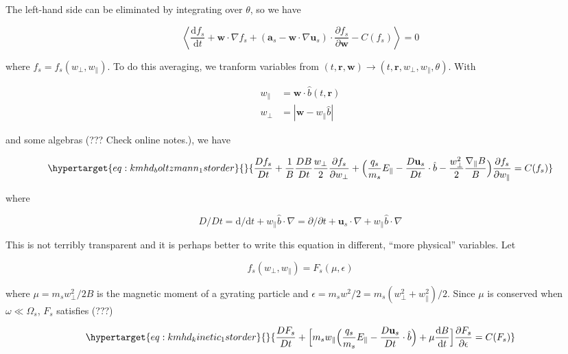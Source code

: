 \documentclass[
  notoc %
]{tufte-book}
\begin{document}
The left-hand side can be eliminated by integrating over \(\theta\), so
we have

\[
\left< \frac{\mathrm{d} f_s}{\mathrm{d}t} + \mathbf{w}\cdot\nabla f_s + (\mathbf{a}_s - \mathbf{w}\cdot\nabla\mathbf{u}_s)\cdot\frac{\partial f_s}{\partial\mathbf{w}} - C(f_s) \right> = 0
\]

where \(f_s = f_s(w_\perp,w_\parallel)\). To do this averaging, we
tranform variables from
\((t,\mathbf{r},\mathbf{w}) \rightarrow(t,\mathbf{r},w_\perp,w_\parallel,\theta)\).
With

\[
\begin{aligned}
w_\parallel &= \mathbf{w}\cdot\hat{b}(t,\mathbf{r}) \\
w_\perp &= |\mathbf{w} - w_\parallel\hat{b}|
\end{aligned}
\]

and some algebras (??? Check online notes.), we have

\begin{equation}\protect\hypertarget{eq:kmhd_boltzmann_1storder}{}{
\frac{D f_s}{Dt} + \frac{1}{B}\frac{D B}{Dt}\frac{w_\perp}{2}\frac{\partial f_s}{\partial w_\perp} + \Big( \frac{q_s}{m_s}E_\parallel - \frac{D\mathbf{u}_s}{Dt}\cdot\hat{b} - \frac{w_\perp^2}{2}\frac{\nabla_\parallel B}{B} \Big)\frac{\partial f_s}{\partial w_\parallel} = C(f_s)
}\label{eq:kmhd_boltzmann_1storder}\end{equation}

where

\[
D/Dt = \mathrm{d}/\mathrm{d}t + w_\parallel \hat{b}\cdot\nabla = \partial/\partial t + \mathbf{u}_s\cdot\nabla + w_\parallel \hat{b}\cdot\nabla
\]

This is not terribly transparent and it is perhaps better to write this
equation in different, ``more physical'' variables. Let

\[
f_s(w_\perp, w_\parallel) = F_s(\mu, \epsilon)
\]

where \(\mu = m_sw_\perp^2/2B\) is the magnetic moment of a gyrating
particle and \(\epsilon=m_sw^2/2 = m_s(w_\perp^2+w_\parallel^2)/2\).
Since \(\mu\) is conserved when \(\omega\ll\Omega_s\), \(F_s\) satisfies
(???)

\begin{equation}\protect\hypertarget{eq:kmhd_kinetic_1storder}{}{
\frac{D F_s}{Dt} + \Big[ m_sw_\parallel\Big( \frac{q_s}{m_s}E_\parallel - \frac{D\mathbf{u}_s}{Dt}\cdot\hat{b} \Big) +\mu\frac{\mathrm{d}B}{\mathrm{d}t} \Big]\frac{\partial F_s}{\partial\epsilon} = C(F_s)
}\label{eq:kmhd_kinetic_1storder}\end{equation}
\end{document}
